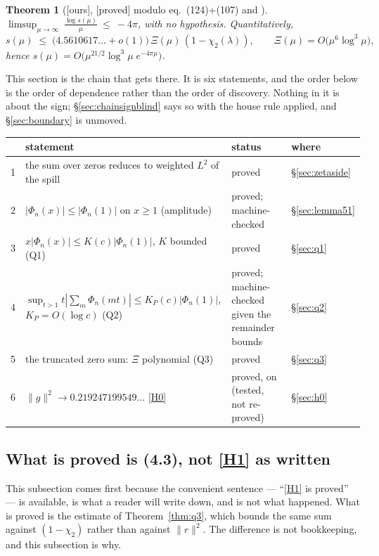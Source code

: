 \documentclass[11pt,a4paper]{article}
\theoremstyle{plain}
\newtheorem{theorem}{Theorem}[section]
\theoremstyle{definition}
\theoremstyle{remark}
\newcommand{\st}[1]{{\normalfont\sffamily\footnotesize[#1]}}
\newcommand{\proved}{\st{proved}}
\newcommand{\ours}{{\normalfont\sffamily\footnotesize[ours]}}
\begin{document}
\begin{theorem}[\ours, \proved{} modulo \cite{Dunster2017} eq.\ (124)+(107) and
\cite{Fuchs1964}]
\label{thm:main}
$\displaystyle\limsup_{\mu\to\infty}\ \frac{\log s(\mu)}{\mu}\ \le\ -4\pi$,
with no hypothesis.  Quantitatively,
\[
  s(\mu)\;\le\;\big(4.5610617\ldots+o(1)\big)\,\Xi(\mu)\,(1-\chi_2(\lambda)),
  \qquad \Xi(\mu)=O\big(\mu^{6}\log^3\!\mu\big),
\]
hence $s(\mu)=O\big(\mu^{21/2}\log^3\!\mu\;e^{-4\pi\mu}\big)$.
\end{theorem}

This section is the chain that gets there.  It is six statements, and the order
below is the order of dependence rather than the order of discovery.  Nothing in
it is about the sign; \S\ref{sec:chainsignblind} says so with the house rule
applied, and \S\ref{sec:boundary} is unmoved.

\begin{center}\small
\begin{tabular}{@{}llll@{}}
\hline
& statement & status & where \\
\hline
1 & the sum over zeros reduces to weighted $L^2$ of the spill
  & proved & \S\ref{sec:zetaside} \\
2 & $|\Phi_n(x)|\le|\Phi_n(1)|$ on $x\ge1$ (amplitude)
  & proved; machine-checked & \S\ref{sec:lemma51} \\
3 & $x|\Phi_n(x)|\le K(c)|\Phi_n(1)|$, $K$ bounded (Q1)
  & proved & \S\ref{sec:q1} \\
4 & $\sup_{t>1}t|\sum_m\Phi_n(mt)|\le K_P(c)|\Phi_n(1)|$, $K_P=O(\log c)$ (Q2)
  & proved; machine-checked given the remainder bounds & \S\ref{sec:q2} \\
5 & the truncated zero sum: $\Xi$ polynomial (Q3)
  & proved & \S\ref{sec:q3} \\
6 & $\|g\|^2\to0.219247199549\ldots$ \eqref{H0}
  & proved, on \cite{Dunster2017} (tested, not re-proved) & \S\ref{sec:h0} \\
\hline
\end{tabular}
\end{center}

\subsection{What is proved is (4.3), not \texorpdfstring{\eqref{H1}}{H1} as
written}
\label{sec:notH1}

This subsection comes first because the convenient sentence --- ``\eqref{H1} is
proved'' --- is available, is what a reader will write down, and is not what
happened.  What is proved is the estimate of Theorem~\ref{thm:q3}, which bounds
the same sum against $(1-\chi_2)$ rather than against $\|r\|^2$.  The difference
is not bookkeeping, and this subsection is why.
\end{document}
